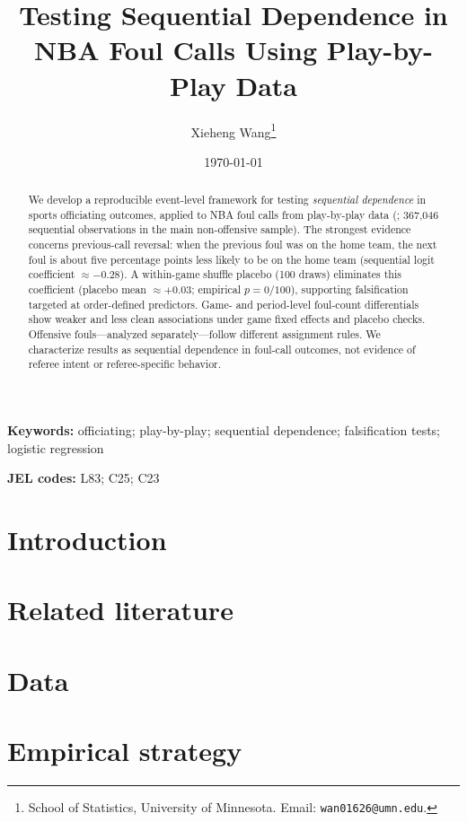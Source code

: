 \documentclass[11pt]{article}
\title{Testing Sequential Dependence in NBA Foul Calls Using Play-by-Play Data}
\author{%
  Xieheng Wang\thanks{School of Statistics, University of Minnesota. Email: \texttt{wan01626@umn.edu}.}%
}
\date{\today}
\begin{document}
\maketitle

\begin{abstract}
We develop a reproducible event-level framework for testing \emph{sequential dependence} in sports officiating outcomes, applied to NBA foul calls from play-by-play data (\sampleseasons{}; 367,046 sequential observations in the main non-offensive sample). The strongest evidence concerns previous-call reversal: when the previous foul was on the home team, the next foul is about five percentage points less likely to be on the home team (sequential logit coefficient $\approx -0.28$). A within-game shuffle placebo (100 draws) eliminates this coefficient (placebo mean $\approx +0.03$; empirical $p=0/100$), supporting falsification targeted at order-defined predictors. Game- and period-level foul-count differentials show weaker and less clean associations under game fixed effects and placebo checks. Offensive fouls---analyzed separately---follow different assignment rules. We characterize results as sequential dependence in foul-call outcomes, not evidence of referee intent or referee-specific behavior.
\end{abstract}

\noindent\textbf{Keywords:} officiating; play-by-play; sequential dependence; falsification tests; logistic regression

\medskip
\noindent\textbf{JEL codes:} L83; C25; C23

\tableofcontents
\clearpage

\section{Introduction}
\label{sec:intro}


\section{Related literature}


\section{Data}


\section{Empirical strategy}

\end{document}
